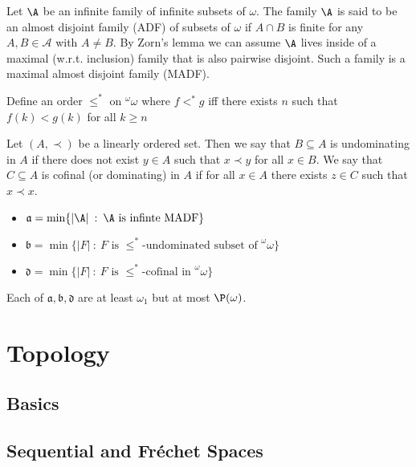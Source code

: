 \documentclass{article}
\begin{document}
\begin{defn}
    Let \(\A\) be an infinite family of infinite subsets of \(\omega\). The family \(\A\) is said to be an almost disjoint family (ADF) of subsets of \(\omega\) if \(A \cap B \) is finite for any \(A,B \in \mathcal{A}\) with \(A \ne B\). By Zorn's lemma we can assume \(\A\) lives inside of a maximal (w.r.t. inclusion) family that is also pairwise disjoint. Such a family is a maximal almost disjoint family (MADF).
\end{defn}
\begin{defn}
    Define an order \(\leq^{\ast}\) on \(^\omega\omega\) where \(f <^{\ast} g\) iff there exists \(n\) such that \(f(k) < g(k)\) for all \(k \geq n\)
\end{defn}
\begin{defn}
    Let \((A, \prec)\) be a linearly ordered set. Then we say that \(B \subseteq A\) is undominating in \(A\) if there does not exist \(y \in A\) such that \(x \prec y\) for all \(x \in B\). We say that \(C \subseteq A\) is cofinal (or dominating) in \(A\) if for all \(x \in A\) there exists \(z \in C\) such that \(x \prec x\).
\end{defn}

\begin{defn}
    \leavevmode
    \begin{itemize}
        \item \(\mathfrak{a} = \min\{|\A| \: : \: \A \text{ is infinte } \text{MADF}\}\)
        \item \(\mathfrak{b} = \min\{|F| \: : \: F \text{ is } \leq^{\ast}\text{-undominated subset of }^\omega\omega\}\)
        \item \(\mathfrak{d} = \min\{|F| \: : \: F \text{ is } \leq^{\ast}\text{-cofinal in } ^\omega\omega
        \}\)
    \end{itemize}
    Each of \(\mathfrak{a}, \mathfrak{b}, \mathfrak{d}\) are at least \(\omega_1\) but at most \(\P(\omega)\).
\end{defn}


\section{Topology}

\subsection{Basics}

\subsection{Sequential and Fréchet Spaces}
\end{document}

